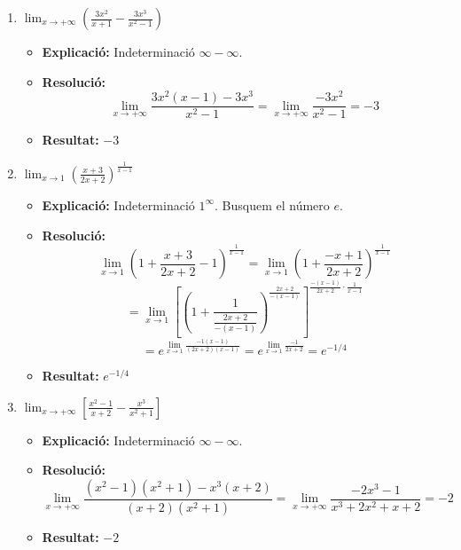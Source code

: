 \documentclass[12pt,a4paper]{article}
\begin{document}
\begin{enumerate}[label=\textbf{7.\arabic*.}]
    \item $\lim_{x \to +\infty} \left( \frac{3x^2}{x+1} - \frac{3x^3}{x^2-1} \right)$
        \begin{itemize}
            \item \textbf{Explicació:} Indeterminació $\infty - \infty$.
            \item \textbf{Resolució:}
            $$ \lim_{x \to +\infty} \frac{3x^2(x-1) - 3x^3}{x^2-1} = \lim_{x \to +\infty} \frac{-3x^2}{x^2-1} = -3 $$
            \item \textbf{Resultat:} $-3$
        \end{itemize}

    \item $\lim_{x \to 1} \left( \frac{x+3}{2x+2} \right)^{\frac{1}{x-1}}$
        \begin{itemize}
            \item \textbf{Explicació:} Indeterminació $1^\infty$. Busquem el número $e$.
            \item \textbf{Resolució:}
            $$ \lim_{x \to 1} \left( 1 + \frac{x+3}{2x+2} - 1 \right)^{\frac{1}{x-1}} = \lim_{x \to 1} \left( 1 + \frac{-x+1}{2x+2} \right)^{\frac{1}{x-1}} $$
            $$ = \lim_{x \to 1} \left[ \left( 1 + \frac{1}{\frac{2x+2}{-(x-1)}} \right)^{\frac{2x+2}{-(x-1)}} \right]^{\frac{-(x-1)}{2x+2} \cdot \frac{1}{x-1}} $$
            $$ = e^{\lim_{x \to 1} \frac{-1(x-1)}{(2x+2)(x-1)}} = e^{\lim_{x \to 1} \frac{-1}{2x+2}} = e^{-1/4} $$
            \item \textbf{Resultat:} $e^{-1/4}$
        \end{itemize}

    \item $\lim_{x \to +\infty} \left[ \frac{x^2-1}{x+2} - \frac{x^3}{x^2+1} \right]$
        \begin{itemize}
            \item \textbf{Explicació:} Indeterminació $\infty - \infty$.
            \item \textbf{Resolució:}
            $$ \lim_{x \to +\infty} \frac{(x^2-1)(x^2+1) - x^3(x+2)}{(x+2)(x^2+1)} = \lim_{x \to +\infty} \frac{-2x^3-1}{x^3+2x^2+x+2} = -2 $$
            \item \textbf{Resultat:} $-2$
        \end{itemize}


\end{enumerate}
\end{document}
